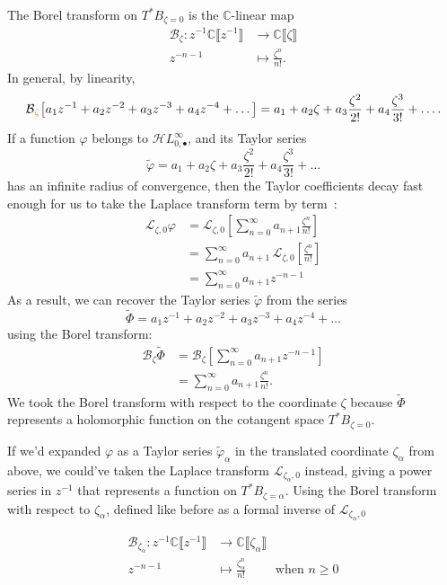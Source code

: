 \documentclass{article}
\newcommand{\singexp}[2]{\mathcal{H}L^\infty_{#1, #2}}
\newcommand{\singexpalg}[1]{\singexp{#1}{\bullet}}
\theoremstyle{definition}
\newcommand{\maps}{\colon}
\newcommand{\C}{\mathbb{C}}
\newcommand{\series}[1]{\tilde{#1}}
\newcommand{\laplace}{\mathcal{L}}
\newcommand{\borel}{\mathcal{B}}
\theoremstyle{plain}
\begin{document}
The Borel transform on $T^*B_{\zeta = 0}$ is the $\C$-linear map
\begin{align*}
\borel_\zeta \maps z^{-1} \C \llbracket z^{-1} \rrbracket & \to \C \llbracket \zeta \rrbracket \\
z^{-n-1} & \mapsto \frac{\zeta^n}{n!}.
\end{align*}
In general, by linearity,
\begin{align*}
\borel\textcolor{orange}{_\zeta}\big[a_1 z^{-1} + a_2 z^{-2} + a_3 z^{-3} + a_4 z^{-4} + \ldots \big] = a_1 + a_2 \zeta + a_3 \frac{\zeta^2}{2!} + a_4 \frac{\zeta^3}{3!} + \ldots.
\end{align*}
If a function $\varphi$ belongs to $\singexpalg{0}$, and its Taylor series
\[ \series{\varphi} = a_1 + a_2 \zeta + a_3 \frac{\zeta^2}{2!} + a_4 \frac{\zeta^3}{3!} + \ldots \]
has an infinite radius of convergence, then the Taylor coefficients decay fast enough for us to take the Laplace transform term by term~\cite[Theorem 5.20]{diverg-resurg-i}:
\begin{align*}
  \laplace_{\zeta, 0}\varphi&=\laplace_{\zeta,0}\left[\sum_{n=0}^\infty a_{n+1}\frac{\zeta^n}{n!}\right]\\
  &=\sum_{n=0}^\infty a_{n+1}\,\laplace_{\zeta,0}\left[\frac{\zeta^n}{n!}\right]\\
  &=\sum_{n=0}^\infty a_{n+1}z^{-n-1}
\end{align*}
As a result, we can recover the Taylor series $\series{\varphi}$ from the series
\[ \series{\Phi} = a_1 z^{-1} + a_2 z^{-2} + a_3 z^{-3} + a_4 z^{-4} + \ldots \]
using the Borel transform:
\begin{align*}
\borel_\zeta \series{\Phi}&=\borel_\zeta\left[\sum_{n=0}^\infty a_{n+1}z^{-n-1}\right]\\
&=\sum_{n=0}^\infty a_{n+1}\frac{\zeta^n}{n!}.
\end{align*}
We took the Borel transform with respect to the coordinate $\zeta$ because $\series{\Phi}$ represents a holomorphic function on the cotangent space $T^*B_{\zeta = 0}$.

If we'd expanded $\varphi$ as a Taylor series $\series{\varphi}_\alpha$ in the translated coordinate $\zeta_\alpha$ from above, we could've taken the Laplace transform $\laplace_{\zeta_\alpha,0}$ instead, giving a power series in $z^{-1}$ that represents a function on $T^*B_{\zeta = \alpha}$. Using the Borel transform with respect to $\zeta_\alpha$, defined like before as a formal inverse of $\laplace_{\zeta_\alpha,0}$

\begin{align*}
     \borel_{\zeta_\alpha}\colon z^{-1}\C\llbracket z^{-1}\rrbracket &\to \C\llbracket \zeta_\alpha \rrbracket  \\
     z^{-n-1}& \mapsto \frac{\zeta_\alpha^n}{n!} \qquad \text{ when } n\geq 0
 \end{align*}
\end{document}
